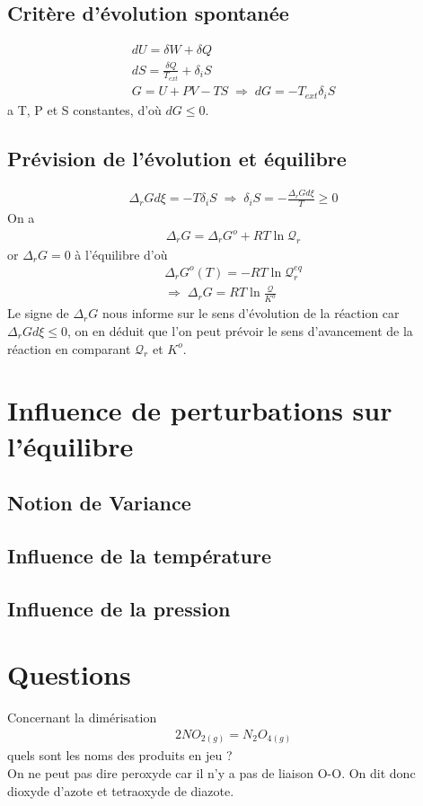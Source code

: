 \documentclass[12pt,prb,aps,epsf]{article}
\begin{document}
\subsection{Critère d'évolution spontanée}
\begin{eqnarray}
dU = \delta W + \delta Q\\
dS = \frac{\delta Q}{T_{ext}} + \delta_i S\\
G = U + PV - TS\;\Rightarrow\; dG = -T_{ext}\delta _i S 
\end{eqnarray}
a T, P et S constantes, d'où $dG \le 0$.

\subsection{Prévision de l'évolution et équilibre}
\begin{eqnarray}
\Delta _rG d\xi = -T\delta_i S \; \Rightarrow \; \delta_i S = -\frac{\Delta_rG d\xi}{T}\ge 0
\end{eqnarray}
On a
\begin{eqnarray}
\Delta_rG = \Delta_rG^o + RT \ln\mathcal{Q}_r
\end{eqnarray}
or $\Delta_rG = 0$ à l'équilibre d'où 
\begin{eqnarray}
\Delta _rG^o(T) = -RT \ln \mathcal{Q}_r^{eq} \\
\Rightarrow\;\Delta_rG = RT \ln \frac{\mathcal{Q}}{K^o}
\end{eqnarray}
Le signe de $\Delta _rG$ nous informe sur le sens d'évolution de la réaction car $\Delta_rG d\xi \le 0$, on en déduit que l'on peut prévoir le sens d'avancement de la réaction en comparant $\mathcal{Q}_r$ et $K^o$.

\section{Influence de perturbations sur l'équilibre}
\subsection{Notion de Variance}
\subsection{Influence de la température}
\subsection{Influence de la pression}

\section*{Questions}
Concernant la dimérisation 
\begin{eqnarray}
2NO_{2(g)} = N_2O_{4(g)}
\end{eqnarray}
quels sont les noms des produits en jeu ?\\
On ne peut pas dire peroxyde car il n'y a pas de liaison O-O. On dit donc dioxyde d'azote et tetraoxyde de diazote.\\
\end{document}
